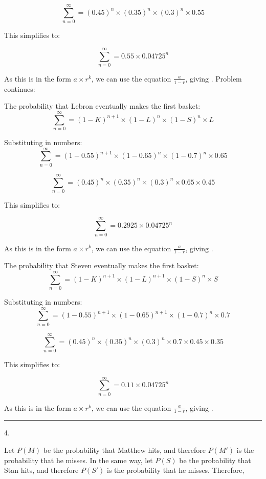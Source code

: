 \documentclass{article}
\begin{document}
\[\sum_{n = 0}^{\infty} = (0.45)^n \times (0.35)^n \times (0.3)^n \times 0.55 \]

This simplifies to:

\[\sum_{n = 0}^{\infty} = 0.55 \times 0.04725^n\]

As this is in the form $a \times r ^ k$, we can use the equation $\frac{a}{1-r}$, giving . Problem continues: 





The probability that Lebron eventually makes the first basket: 
\[\sum_{n = 0}^{\infty} = (1-K)^{n+1} \times (1-L)^{n} \times (1-S)^n \times L \]

Substituting in numbers:
\[\sum_{n = 0}^{\infty} = (1-0.55)^{n+1} \times (1-0.65)^n \times (1-0.7)^n \times 0.65 \]

\[\sum_{n = 0}^{\infty} = (0.45)^{n} \times (0.35)^n \times (0.3)^n \times 0.65 \times 0.45 \]

This simplifies to:

\[\sum_{n = 0}^{\infty} = 0.2925 \times 0.04725^n\]

As this is in the form $a \times r ^ k$, we can use the equation $\frac{a}{1-r}$, giving .






The probability that Steven eventually makes the first basket: 
\[\sum_{n = 0}^{\infty} = (1-K)^{n+1} \times (1-L)^{n+1} \times (1-S)^n \times S \]


Substituting in numbers:
\[\sum_{n = 0}^{\infty} = (1-0.55)^{n+1} \times (1-0.65)^{n+1} \times (1-0.7)^n \times 0.7 \]

\[\sum_{n = 0}^{\infty} = (0.45)^n \times (0.35)^n \times (0.3)^n \times 0.7 \times0.45 \times 0.35 \]

This simplifies to:

\[\sum_{n = 0}^{\infty} = 0.11 \times 0.04725^n\]

As this is in the form $a \times r ^ k$, we can use the equation $\frac{a}{1-r}$, giving .


\noindent\rule{8cm}{0.4pt} 

4. 



Let $P(M)$ be the probability that Matthew hits, and therefore $P(M')$ is the probability that he misses. In the same way, let $P(S)$ be the probability that Stan hits, and therefore $P(S')$ is the probability that he misses. Therefore,
\end{document}
